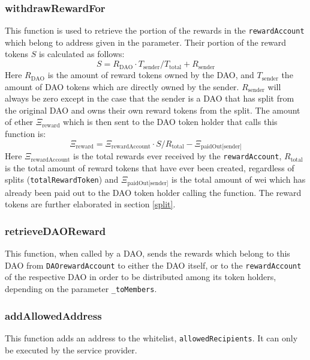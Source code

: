 \documentclass[9pt,oneside]{amsart}
\begin{document}
\begin{multicols}{2}
\subsubsection*{withdrawRewardFor}
This function is used to retrieve the portion of the rewards in the \verb|rewardAccount| which belong to address given in the parameter.
Their portion of the reward tokens $S$ is calculated as follows:
\begin{equation}
 S = R_{\text{DAO}} \cdot T_{\text{sender}} / T_{\text{total}} + R_{\text{sender}}
\end{equation}
Here $R_{\text{DAO}}$ is the amount of reward tokens owned by the DAO, and $T_{\text{sender}}$ the amount of DAO tokens which are directly owned by the sender. $R_{\text{sender}}$ will always be zero except in the case that the sender is a DAO that has split from the original DAO and owns their own reward tokens from the split.
The amount of ether $\Xi_{\text{reward}}$ which is then sent to the DAO token holder that calls this function is:
\begin{equation}
\Xi_{\text{reward}} = \Xi_{\text{rewardAccount}} \cdot S / R_{\text{total}} - \Xi_{\text{paidOut[sender]}}
\end{equation}
Here $\Xi_{\text{rewardAccount}}$ is the total rewards ever received by the \verb|rewardAccount|, $R_{\text{total}}$ is the total amount of reward tokens that have ever been created, regardless of splits (\verb|totalRewardToken|) and $\Xi_{\text{paidOut[sender]}}$ is the total amount of wei which has already been paid out to the DAO token holder calling the function. The reward tokens are further elaborated in section \ref{split}.

\subsubsection*{retrieveDAOReward}
This function, when called by a DAO, sends the rewards which belong to this DAO from \verb|DAOrewardAccount| to either the DAO itself, or to the \verb|rewardAccount| of the respective DAO in order to be distributed among its token holders, depending on the parameter \verb|_toMembers|.

\subsubsection*{addAllowedAddress}
This function adds an address to the whitelist, \verb|allowedRecipients|. It can only be executed by the service provider.


\end{multicols}
\end{document}
